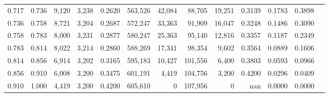 \begin{tabular}{rrrrrrrrrrrrr}
0.717 & 0.736 &  9,120 & 3,238 &                                     0.2620 & 563,526 &  42,084 &  88,705 &  19,251 & 0.3139 & 0.1783 & 0.3898 \\
0.736 & 0.758 &  8,721 & 3,204 &                                     0.2687 & 572,247 &  33,363 &  91,909 &  16,047 & 0.3248 & 0.1486 & 0.3090 \\
0.758 & 0.783 &  8,000 & 3,231 &                                     0.2877 & 580,247 &  25,363 &  95,140 &  12,816 & 0.3357 & 0.1187 & 0.2349 \\
0.783 & 0.814 &  8,022 & 3,214 &                                     0.2860 & 588,269 &  17,341 &  98,354 &   9,602 & 0.3564 & 0.0889 & 0.1606 \\
0.814 & 0.856 &  6,914 & 3,202 &                                     0.3165 & 595,183 &  10,427 & 101,556 &   6,400 & 0.3803 & 0.0593 & 0.0966 \\
0.856 & 0.910 &  6,008 & 3,200 &                                     0.3475 & 601,191 &   4,419 & 104,756 &   3,200 & 0.4200 & 0.0296 & 0.0409 \\
0.910 & 1.000 &  4,419 & 3,200 &                                     0.4200 & 605,610 &       0 & 107,956 &       0 &    nan & 0.0000 & 0.0000 \\
\bottomrule
\end{tabular}
